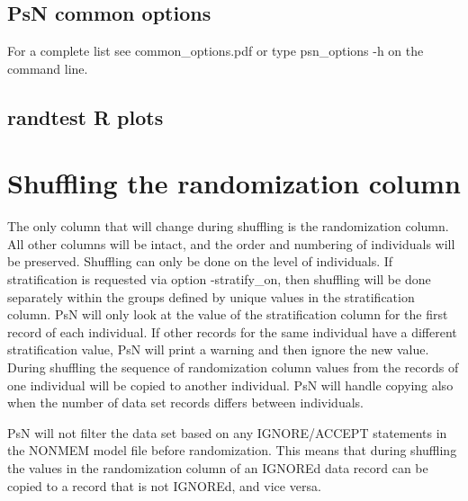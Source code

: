 \subsection{PsN common options}
For a complete list see common\_options.pdf or type psn\_options -h on the command line.

\subsection{randtest R plots}
\newcommand{\rplotsconditions}{See section Output, subsections Basic and Extended R plots, for descriptions of the default randtest R plots. The default randtest template requires that option -base\_model was used, that input (full) model has more THETAs than base (reduced) model, and that the additional THETAs are the ones relevant for the randomization column. For basic R plots it is required that R libraries xpose4 and grid are installed. Extended R plots also require that R libraries
ggplot2, reshape2, gridExtra, scales, MASS and plotrix are installed. If the conditions are not fulfilled then no pdf will be generated, see the .Rout file in the main run directory for error messages.}


\section{Shuffling the randomization column}
The only column that will change during shuffling is the randomization column. All other columns will be intact, and the order and numbering of individuals will be preserved. Shuffling can only be done on the level of individuals. If stratification is requested via option -stratify\_on, then shuffling will be done separately within the groups defined by unique values in the stratification column. PsN will only look at the value of the stratification column for the first record of each individual. If other records for the same individual have a different stratification value, PsN will print a warning and then ignore the new value.
During shuffling the sequence of randomization column values from the records of one individual will be copied to another individual. PsN will handle copying also when the number of data set records differs between individuals.

PsN will not filter the data set based on any IGNORE/ACCEPT statements in the NONMEM model file before randomization. This means that during shuffling the values in the randomization column of an IGNOREd data record can be copied to a record that is not IGNOREd, and vice versa.

